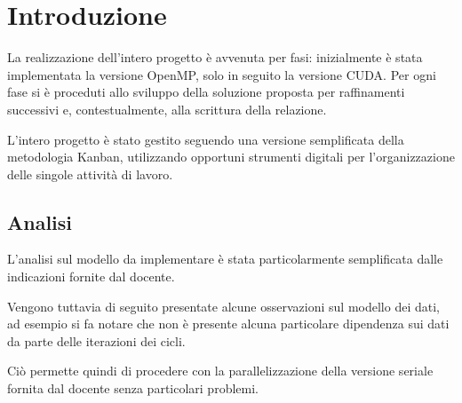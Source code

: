 \section{Introduzione}

La realizzazione dell'intero progetto è avvenuta per fasi: inizialmente è stata
implementata la versione OpenMP, solo in seguito la versione CUDA.
Per ogni fase si è proceduti allo sviluppo della soluzione proposta per
raffinamenti successivi e, contestualmente, alla scrittura della relazione.

L'intero progetto è stato gestito seguendo una versione semplificata della
metodologia Kanban\cite{wiki:kanbandev}, utilizzando opportuni strumenti digitali per
l'organizzazione delle singole attività di lavoro.

\subsection{Analisi}
L'analisi sul modello da implementare è stata particolarmente semplificata dalle
indicazioni fornite dal docente.

Vengono tuttavia di seguito presentate alcune osservazioni sul modello dei dati,
ad esempio si fa notare che non è presente alcuna particolare dipendenza sui
dati da parte delle iterazioni dei cicli.

Ciò permette quindi di procedere con la parallelizzazione della versione seriale
fornita dal docente senza particolari problemi.
